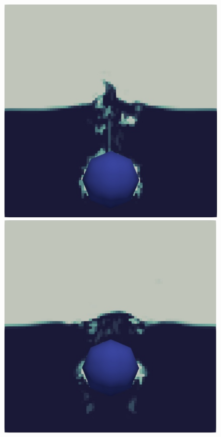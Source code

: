 \begin{figure}[H]
\begin{minipage}{.4\textwidth}
    \end{minipage}%
    \hspace{0.05\textwidth}
    \begin{minipage}{.4\textwidth}
        \centering
        \includegraphics[width=\linewidth]{GWU_Thesis_Sarmakeeva/Images/chap4/water_sphere/sphere_in_water07.png}
    \end{minipage}
    \newline
    \begin{minipage}{.4\textwidth}
        \centering
        \includegraphics[width=\linewidth]{GWU_Thesis_Sarmakeeva/Images/chap4/water_sphere/sphere_in_water09.png}

\end{minipage}
\end{figure}
